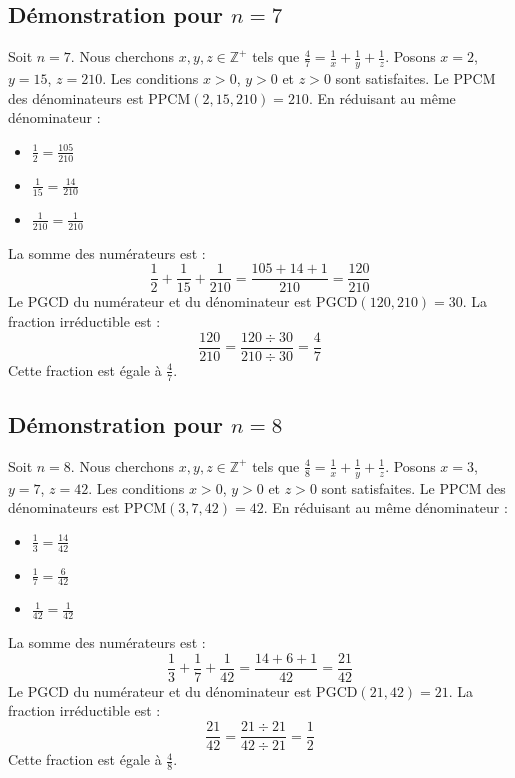 \documentclass[11pt,a4paper]{article}
\begin{document}
\subsection{Démonstration pour $n = 7$}
Soit $n = 7$. Nous cherchons $x, y, z \in \mathbb{Z}^{+}$ tels que $\frac{4}{7} = \frac{1}{x} + \frac{1}{y} + \frac{1}{z}$.
Posons $x = 2$, $y = 15$, $z = 210$.
Les conditions $x > 0$, $y > 0$ et $z > 0$ sont satisfaites.
Le PPCM des dénominateurs est $\text{PPCM}(2, 15, 210) = 210$.
En réduisant au même dénominateur :
\begin{itemize}
    \item $\frac{1}{2} = \frac{105}{210}$
    \item $\frac{1}{15} = \frac{14}{210}$
    \item $\frac{1}{210} = \frac{1}{210}$
\end{itemize}
La somme des numérateurs est :
$$ \frac{1}{2} + \frac{1}{15} + \frac{1}{210} = \frac{105 + 14 + 1}{210} = \frac{120}{210} $$
Le PGCD du numérateur et du dénominateur est $\text{PGCD}(120, 210) = 30$.
La fraction irréductible est :
$$ \frac{120}{210} = \frac{120 \div 30}{210 \div 30} = \frac{4}{7} $$
Cette fraction est égale à $\frac{4}{7}$.

\subsection{Démonstration pour $n = 8$}
Soit $n = 8$. Nous cherchons $x, y, z \in \mathbb{Z}^{+}$ tels que $\frac{4}{8} = \frac{1}{x} + \frac{1}{y} + \frac{1}{z}$.
Posons $x = 3$, $y = 7$, $z = 42$.
Les conditions $x > 0$, $y > 0$ et $z > 0$ sont satisfaites.
Le PPCM des dénominateurs est $\text{PPCM}(3, 7, 42) = 42$.
En réduisant au même dénominateur :
\begin{itemize}
    \item $\frac{1}{3} = \frac{14}{42}$
    \item $\frac{1}{7} = \frac{6}{42}$
    \item $\frac{1}{42} = \frac{1}{42}$
\end{itemize}
La somme des numérateurs est :
$$ \frac{1}{3} + \frac{1}{7} + \frac{1}{42} = \frac{14 + 6 + 1}{42} = \frac{21}{42} $$
Le PGCD du numérateur et du dénominateur est $\text{PGCD}(21, 42) = 21$.
La fraction irréductible est :
$$ \frac{21}{42} = \frac{21 \div 21}{42 \div 21} = \frac{1}{2} $$
Cette fraction est égale à $\frac{4}{8}$.
\end{document}
